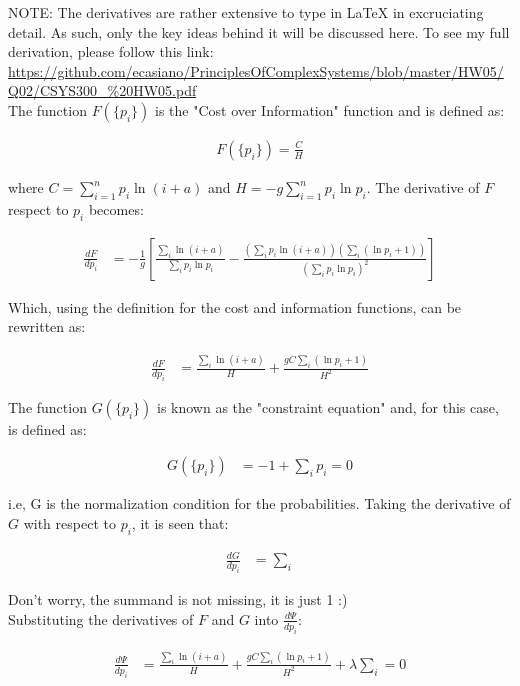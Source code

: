 \documentclass{article}
\begin{document}
NOTE: The derivatives are rather extensive to type in LaTeX in excruciating detail. As such, only the key ideas behind it will be discussed here. To see my full derivation, please follow this link: \url{https://github.com/ecasiano/PrinciplesOfComplexSystems/blob/master/HW05/Q02/CSYS300_%20HW05.pdf} \\

The function $F(\lbrace p_i \rbrace)$ is the "Cost over Information" function and is defined as:

\begin{align}
F(\lbrace p_i \rbrace) = \frac{C}{H}
\end{align}

where $C = \sum_{i=1}^{n} p_i \ln(i+a)$ and $H = -g \sum_{i=1}^{n} p_i \ln p_i$. The derivative of $F$ respect to $p_i$ becomes:

\begin{align}
\frac{dF}{dp_i} &= -\frac{1}{g} [\frac{\sum_i \ln (i+a)}{\sum_i p_i \ln p_i} - \frac{(\sum_i p_i \ln(i+a))(\sum_i(\ln p_i + 1))}{(\sum_i p_i \ln p_i)^2}]
\end{align}

Which, using the definition for the cost and information functions, can be rewritten as:

\begin{align}
\frac{dF}{dp_i} &= \frac{\sum_i \ln(i+a)}{H} + \frac{gC\sum_i(\ln p_i + 1)}{H^2}
\end{align}

The function $G(\{ p_i \})$ is known as the "constraint equation" and, for this case, is defined as:

\begin{align}
G(\{ p_i \}) &= -1 + \sum_i p_i = 0
\end{align}

i.e, G is the normalization condition for the probabilities. Taking the derivative of $G$ with respect to $p_i$, it is seen that:

\begin{align}
\frac{dG}{dp_i} &= \sum_{i} 
\end{align}

Don't worry, the summand is not missing, it is just 1 :) \\

Substituting the derivatives of $F$ and $G$ into $\frac{d\Psi}{dp_i}$:

\begin{align}
\frac{d\Psi}{dp_i} &= \frac{\sum_i \ln(i+a)}{H} + \frac{gC\sum_i(\ln p_i + 1)}{H^2} + \lambda \sum_i = 0
\end{align}
\end{document}
